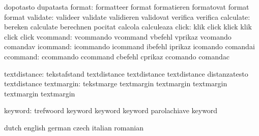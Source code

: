                            dopotasto                 dupatasta
                   format: formatteer                format
                           formatieren               formatovat
                           format                    format %
                 validate: valideer                  validate
                           validieren                validovat
                           verifica                  verifica
                calculate: bereken                   calculate
                           berechnen                 pocitat
                           calcola                   calculeaza
                    click: klik                      click
                           klick                     klik
                           click                     click
                 vcommand: vcommando                 vcommand
                           vbefehl                   vprikaz
                           vcomando                  comandav
                 icommand: icommando                 icommand
                           ibefehl                   iprikaz
                           icomando                  comandai
                 ccommand: ccommando                 ccommand
                           cbefehl                   cprikaz
                           ccomando                  comandac

             textdistance: tekstafstand              textdistance
                           textdistance              textdistance
                           distanzatesto             textdistance %
               textmargin: tekstmarge                textmargin
                           textmargin                textmargin
                           textmargin                textmargin   %

  keyword: trefwoord keyword
           keyword keyword
           parolachiave keyword

\stopconstants




\startvariables            dutch                     english
                           german                    czech
                           italian                   romanian

